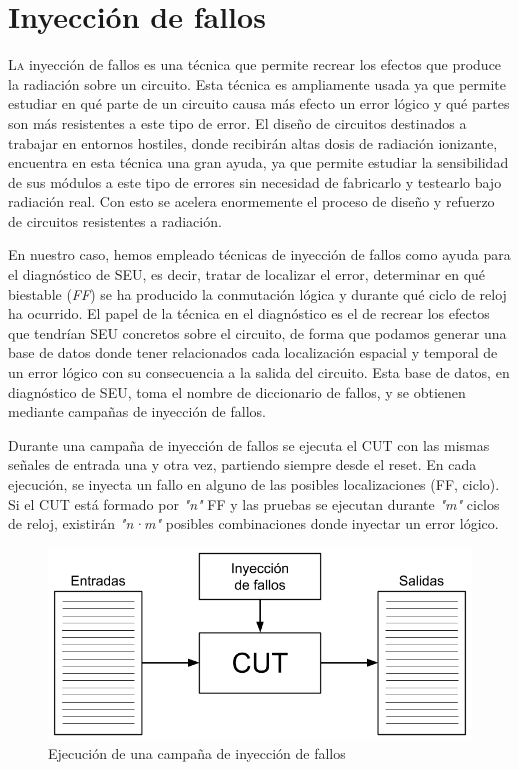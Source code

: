 \chapter{Inyección de fallos}
\label{ch:InyeccionDeFallos}

\lettrine[lraise=-0.1, lines=2, loversize=0.2]{L}{a} inyección de fallos es una
técnica que permite recrear los efectos que produce la radiación sobre un
circuito. Esta técnica es ampliamente usada ya que permite estudiar en qué parte
de un circuito causa más efecto un error lógico y qué partes son más resistentes a
este tipo de error. El diseño de circuitos destinados a trabajar en entornos 
hostiles, donde recibirán altas dosis de radiación ionizante, encuentra en esta
técnica una gran ayuda, ya que permite estudiar la sensibilidad de sus módulos a
este tipo de errores sin necesidad de fabricarlo y testearlo bajo radiación real.
Con esto se acelera enormemente el proceso de diseño y refuerzo de circuitos
resistentes a radiación.

En nuestro caso, hemos empleado técnicas de inyección de fallos como ayuda para el
diagnóstico de \gls{SEU}, es decir, tratar de localizar el error, determinar en 
qué biestable (\textit{\gls{FF}}) se ha producido la conmutación lógica y durante
qué ciclo de reloj ha ocurrido. El papel de la técnica en el diagnóstico es el de
recrear los efectos que tendrían \gls{SEU} concretos sobre el circuito, de forma
que podamos generar una base de datos donde tener relacionados cada localización
espacial y temporal de un error lógico con su consecuencia a la salida del
circuito. Esta base de datos, en diagnóstico de \gls{SEU}, toma el nombre de
diccionario de fallos, y se obtienen mediante campañas de inyección de fallos.

Durante una campaña de inyección de fallos se ejecuta el \gls{CUT} con las mismas
señales de entrada una y otra vez, partiendo siempre desde el reset. En cada
ejecución, se inyecta un fallo en alguno de las posibles localizaciones (\gls{FF}, 
ciclo). Si el \gls{CUT} está formado por \textit{"n"} \gls{FF} y las pruebas se 
ejecutan durante \textit{"m"} ciclos de reloj, existirán \textit{"n·m"} posibles 
combinaciones donde inyectar un error lógico.

\begin{figure}[htbp]
    \centering
    \includegraphics[width=0.95\linewidth]
    {InyeccionDeFallos/figuras/fig_1.png}
    \caption{Ejecución de una campaña de inyección de fallos}
    \label{fig:Inyeccion}
\end{figure}

